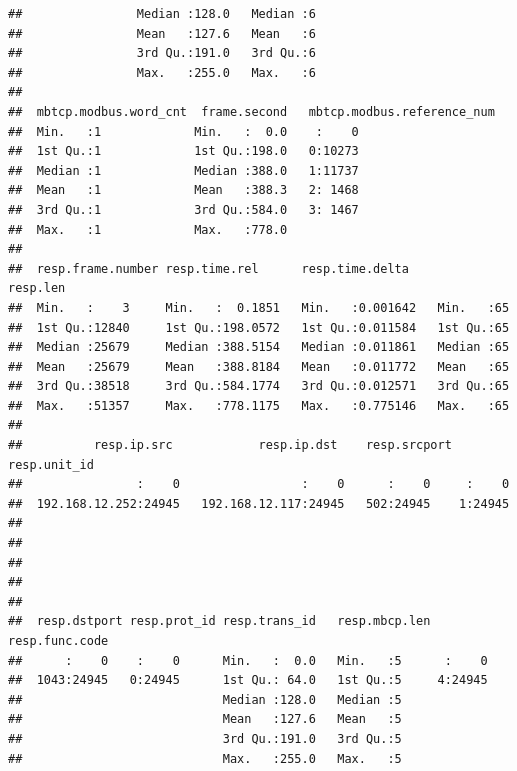 \documentclass[]{article}
\begin{document}
\begin{verbatim}
##                Median :128.0   Median :6                         
##                Mean   :127.6   Mean   :6                         
##                3rd Qu.:191.0   3rd Qu.:6                         
##                Max.   :255.0   Max.   :6                         
##                                                                  
##  mbtcp.modbus.word_cnt  frame.second   mbtcp.modbus.reference_num
##  Min.   :1             Min.   :  0.0    :    0                   
##  1st Qu.:1             1st Qu.:198.0   0:10273                   
##  Median :1             Median :388.0   1:11737                   
##  Mean   :1             Mean   :388.3   2: 1468                   
##  3rd Qu.:1             3rd Qu.:584.0   3: 1467                   
##  Max.   :1             Max.   :778.0                             
##                                                                  
##  resp.frame.number resp.time.rel      resp.time.delta       resp.len 
##  Min.   :    3     Min.   :  0.1851   Min.   :0.001642   Min.   :65  
##  1st Qu.:12840     1st Qu.:198.0572   1st Qu.:0.011584   1st Qu.:65  
##  Median :25679     Median :388.5154   Median :0.011861   Median :65  
##  Mean   :25679     Mean   :388.8184   Mean   :0.011772   Mean   :65  
##  3rd Qu.:38518     3rd Qu.:584.1774   3rd Qu.:0.012571   3rd Qu.:65  
##  Max.   :51357     Max.   :778.1175   Max.   :0.775146   Max.   :65  
##                                                                      
##          resp.ip.src            resp.ip.dst    resp.srcport resp.unit_id
##                :    0                 :    0      :    0     :    0     
##  192.168.12.252:24945   192.168.12.117:24945   502:24945    1:24945     
##                                                                         
##                                                                         
##                                                                         
##                                                                         
##                                                                         
##  resp.dstport resp.prot_id resp.trans_id   resp.mbcp.len resp.func.code
##      :    0    :    0      Min.   :  0.0   Min.   :5      :    0       
##  1043:24945   0:24945      1st Qu.: 64.0   1st Qu.:5     4:24945       
##                            Median :128.0   Median :5                   
##                            Mean   :127.6   Mean   :5                   
##                            3rd Qu.:191.0   3rd Qu.:5                   
##                            Max.   :255.0   Max.   :5                   

\end{verbatim}
\end{document}
